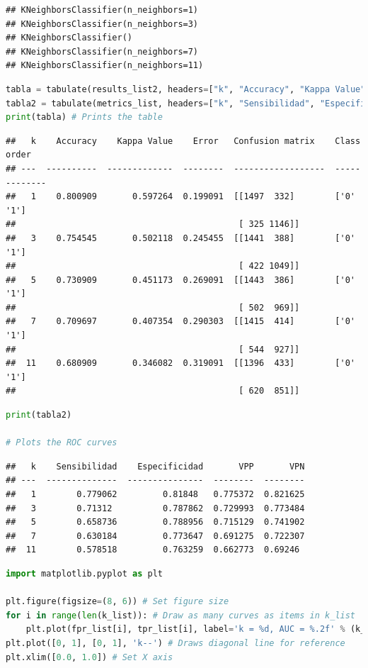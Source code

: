 \documentclass[
]{article}
\begin{document}
\begin{lstlisting}
## KNeighborsClassifier(n_neighbors=1)
## KNeighborsClassifier(n_neighbors=3)
## KNeighborsClassifier()
## KNeighborsClassifier(n_neighbors=7)
## KNeighborsClassifier(n_neighbors=11)
\end{lstlisting}

\begin{lstlisting}[language=Python]
tabla = tabulate(results_list2, headers=["k", "Accuracy", "Kappa Value", "Error ", "Confusion matrix", "Class order"])
tabla2 = tabulate(metrics_list, headers=["k", "Sensibilidad", "Especificidad", "VPP", "VPN"])
print(tabla) # Prints the table
\end{lstlisting}

\begin{lstlisting}
##   k    Accuracy    Kappa Value    Error   Confusion matrix    Class order
## ---  ----------  -------------  --------  ------------------  -------------
##   1    0.800909       0.597264  0.199091  [[1497  332]        ['0' '1']
##                                            [ 325 1146]]
##   3    0.754545       0.502118  0.245455  [[1441  388]        ['0' '1']
##                                            [ 422 1049]]
##   5    0.730909       0.451173  0.269091  [[1443  386]        ['0' '1']
##                                            [ 502  969]]
##   7    0.709697       0.407354  0.290303  [[1415  414]        ['0' '1']
##                                            [ 544  927]]
##  11    0.680909       0.346082  0.319091  [[1396  433]        ['0' '1']
##                                            [ 620  851]]
\end{lstlisting}

\begin{lstlisting}[language=Python]
print(tabla2)

# Plots the ROC curves
\end{lstlisting}

\begin{lstlisting}
##   k    Sensibilidad    Especificidad       VPP       VPN
## ---  --------------  ---------------  --------  --------
##   1        0.779062         0.81848   0.775372  0.821625
##   3        0.71312          0.787862  0.729993  0.773484
##   5        0.658736         0.788956  0.715129  0.741902
##   7        0.630184         0.773647  0.691275  0.722307
##  11        0.578518         0.763259  0.662773  0.69246
\end{lstlisting}

\begin{lstlisting}[language=Python]
import matplotlib.pyplot as plt

plt.figure(figsize=(8, 6)) # Set figure size
for i in range(len(k_list)): # Draw as many curves as items in k_list
    plt.plot(fpr_list[i], tpr_list[i], label='k = %d, AUC = %.2f' % (k_list[i], roc_auc_list[i])) # Plots the curve for each k and sets the AUC values for the legend
plt.plot([0, 1], [0, 1], 'k--') # Draws diagonal line for reference
plt.xlim([0.0, 1.0]) # Set X axis
\end{lstlisting}
\end{document}
